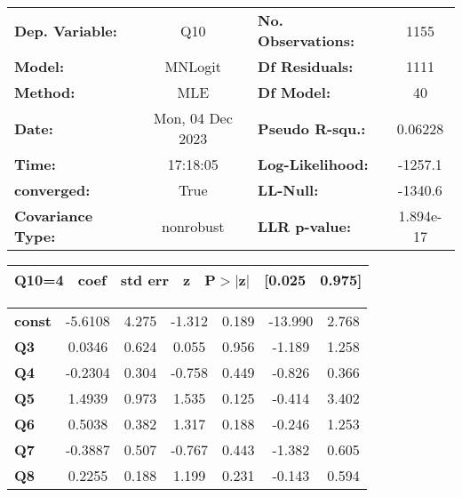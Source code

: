 \begin{center}
\begin{tabular}{lclc}
\toprule
\textbf{Dep. Variable:}   &       Q10        & \textbf{  No. Observations:  } &     1155    \\
\textbf{Model:}           &     MNLogit      & \textbf{  Df Residuals:      } &     1111    \\
\textbf{Method:}          &       MLE        & \textbf{  Df Model:          } &       40    \\
\textbf{Date:}            & Mon, 04 Dec 2023 & \textbf{  Pseudo R-squ.:     } &  0.06228    \\
\textbf{Time:}            &     17:18:05     & \textbf{  Log-Likelihood:    } &   -1257.1   \\
\textbf{converged:}       &       True       & \textbf{  LL-Null:           } &   -1340.6   \\
\textbf{Covariance Type:} &    nonrobust     & \textbf{  LLR p-value:       } & 1.894e-17   \\
\bottomrule
\end{tabular}
\begin{tabular}{ccccccc}
 \textbf{Q10=4}  & \textbf{coef} & \textbf{std err} & \textbf{z} & \textbf{P$> |$z$|$} & \textbf{[0.025} & \textbf{0.975]}  \\
\midrule
\bottomrule
\end{tabular}
\begin{tabular}{lcccccc}
\textbf{const}   &      -5.6108  &        4.275     &    -1.312  &         0.189        &      -13.990    &        2.768     \\
\textbf{Q3}      &       0.0346  &        0.624     &     0.055  &         0.956        &       -1.189    &        1.258     \\
\textbf{Q4}      &      -0.2304  &        0.304     &    -0.758  &         0.449        &       -0.826    &        0.366     \\
\textbf{Q5}      &       1.4939  &        0.973     &     1.535  &         0.125        &       -0.414    &        3.402     \\
\textbf{Q6}      &       0.5038  &        0.382     &     1.317  &         0.188        &       -0.246    &        1.253     \\
\textbf{Q7}      &      -0.3887  &        0.507     &    -0.767  &         0.443        &       -1.382    &        0.605     \\
\textbf{Q8}      &       0.2255  &        0.188     &     1.199  &         0.231        &       -0.143    &        0.594     \\

\end{tabular}
\end{center}

